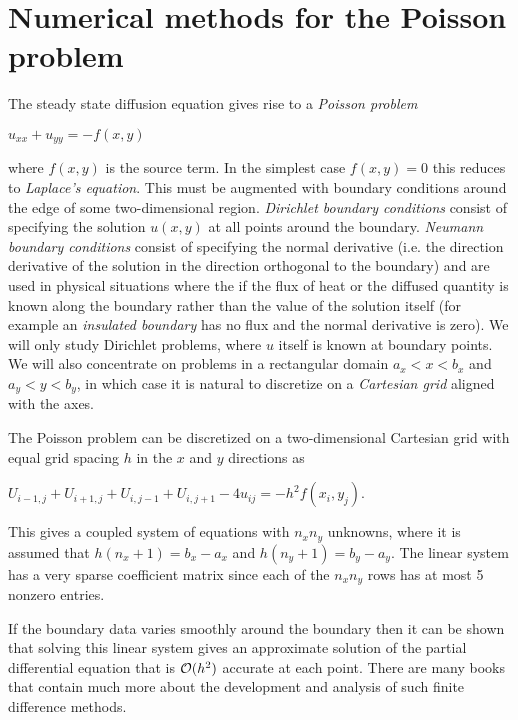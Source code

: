 \documentclass[letterpaper,10pt,english]{sphinxmanual}
\begin{document}
\section{Numerical methods for the Poisson problem}
\label{poisson:numerical-methods-for-the-poisson-problem}\label{poisson::doc}\label{poisson:poisson}
The steady state diffusion equation gives rise to a \emph{Poisson problem}

\(u_{xx} + u_{yy} = -f(x,y)\)

where \(f(x,y)\) is the source term.  In the simplest case
\(f(x,y) = 0\) this reduces to \emph{Laplace's equation}.
This must be augmented with boundary conditions around the edge of some
two-dimensional region.  \emph{Dirichlet boundary conditions} consist of
specifying the solution \(u(x,y)\) at all points around the boundary.
\emph{Neumann boundary conditions} consist of specifying the normal derivative
(i.e. the direction derivative of the solution in the direction orthogonal
to the boundary) and are used in physical situations where the if the flux of
heat or the diffused quantity is known along the boundary rather than the
value of the solution itself (for example an \emph{insulated boundary} has no
flux and the normal derivative is zero).  We will only study Dirichlet
problems, where \(u\) itself is known at boundary points.  We will also
concentrate on problems in a rectangular domain \(a_x < x < b_x\) and
\(a_y < y < b_y\), in which case it is natural to discretize
on a \emph{Cartesian grid} aligned with the axes.

The Poisson problem can be discretized on a two-dimensional Cartesian grid
with equal grid
spacing \(h\) in the \(x\) and \(y\) directions as

\(U_{i-1,j} + U_{i+1,j} + U_{i,j-1} + U_{i,j+1} - 4u_{ij} = -h^2
f(x_i,y_j)\).

This gives a coupled system of equations with \(n_x n_y\) unknowns,
where it is assumed that \(h(n_x+1) = b_x - a_x\) and
\(h(n_y+1) = b_y - a_y\).  The linear system has a very sparse
coefficient matrix since each of the \(n_x n_y\) rows has at most 5
nonzero entries.

If the boundary data varies smoothly around the boundary then it can be
shown that solving this linear system gives an approximate solution
of the partial differential equation that is \({\cal O}(h^2)\) accurate
at each point.  There are many books that contain much
more about the development and analysis of such finite difference methods.
\end{document}

